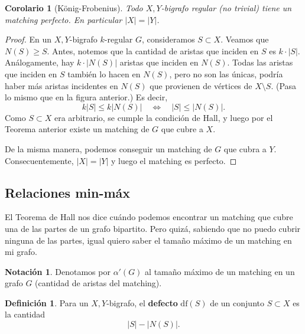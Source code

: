 \documentclass[12pt]{report}
\theoremstyle{plain}
\newtheorem{corollary}[theorem]{Corolario}
\theoremstyle{definition}
\newtheorem{definition}[theorem]{Definición}
\newtheorem{notation}[theorem]{Notación}
\newcommand{\abs}[1]{\left \vert #1 \right \vert}
\newcommand{\defecto}[1]{\mathrm{df}(#1)}
\begin{document}
\begin{corollary}[König-Frobenius]
Todo $X,Y$-bigrafo regular (no trivial) tiene un matching perfecto. En particular $\abs X = \abs Y$.
\end{corollary}
\begin{proof}
    En un $X,Y$-bigrafo $k$-regular $G$, consideramos $S \subset X$. Veamos que $N(S) \geq S$. Antes, notemos que
     la cantidad de aristas que inciden en $S$ es $k \cdot \abs S$. Análogamente, hay $k \cdot \abs{N(S)}$
     aristas que inciden en $N(S)$. Todas las aristas que inciden en $S$ también lo hacen en $N(S)$, pero no son
     las únicas, podría haber más aristas incidentes en $N(S)$ que provienen de vértices de $X \setminus S$. (Pasa lo
      mismo que en la figura anterior.) Es
     decir,
     \[
         k \abs S \leq k \abs{N(S)} \quad \Leftrightarrow \quad \abs S \leq \abs{N(S)}.
     \]
     Como $S\subset X$ era arbitrario, se cumple la condición de Hall, y luego por el Teorema anterior existe un
     matching de $G$ que cubre a $X$.

    De la misma manera, podemos conseguir un matching de $G$ que cubra a $Y$. Consecuentemente, $\abs X = \abs Y$
    y luego el matching es perfecto.
\end{proof}


\subsection{Relaciones min-máx}

El Teorema de Hall nos dice cuándo podemos encontrar un matching que cubre una de las partes de un grafo bipartito.
Pero quizá, sabiendo que no puedo cubrir ninguna de las partes, igual quiero saber el tamaño máximo de un matching en
 mi grafo.

\begin{notation}
Denotamos por $\alpha ' (G)$ al tamaño máximo de un matching en un grafo $G$ (cantidad de aristas del matching).
\end{notation}

\begin{definition}
    Para un $X,Y$-bigrafo, el \textbf{defecto} $\defecto{S}$ de un conjunto $S \subset X$ es la cantidad
    \[
        \abs S - \abs{N(S)}.
    \]
\end{definition}
\end{document}
